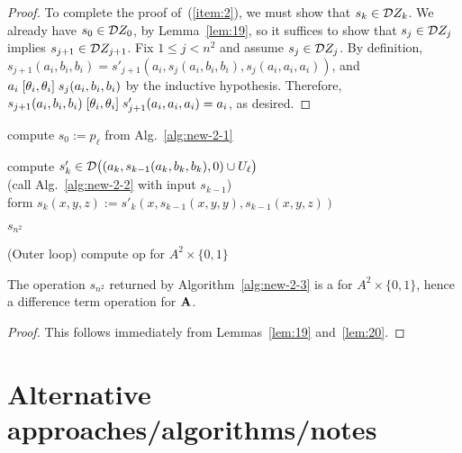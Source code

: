 \begin{proof}
To complete the proof of~(\ref{item:2}), 
we must show that $s_k \in \mathcal{D} Z_k$.   
We already have $s_0\in \mathcal{D} Z_0$, by Lemma~\ref{lem:19},
so it suffices to show that $s_j \in \mathcal{D} Z_j$ implies 
$s_{j+1} \in \mathcal{D} Z_{j+1}$.
Fix $1\leq j < n^2$ and assume $s_j \in \mathcal{D} Z_j$.
By definition, 
$s_{j+1}(a_i, b_i, b_i) =  s'_{j+1}(a_i,s_{j}(a_i,b_i,b_i),s_{j}(a_i,a_i,a_i))$, and
$a_i \mathrel{[\theta_i, \theta_i]} s_j(a_i, b_i, b_i)$ by the inductive hypothesis. Therefore,
$s_{j+1}(a_i, b_i, b_i) \mathrel{[\theta_i, \theta_i]} s'_{j+1}(a_i,a_i,a_i) = a_i$, as desired.
    
  \end{proof}
  

\begin{algorithm}  
  
  compute $s_0 := p_{\ell}$ from Alg.~\ref{alg:new-2-1}
  
   {
    
    compute $s'_k \in \mathcal{D} \bigl((a_k, s_{k-1}(a_k, b_k, b_k), 0) \cup U_{\ell}\bigr)$\\
    (call Alg.~\ref{alg:new-2-2} with input $s_{k-1}$)\\[4pt]

    form $s_k(x,y,z) := s'_k(x, s_{k-1}(x,y,y), s_{k-1}(x,y,z))$
  }
  \Return $s_{n^2}$
  \caption{(Outer loop) compute \ldt  op for $A^2 \times \{0,1\}$\label{alg:new-2-3}}
\end{algorithm}


\begin{prop}
  The operation $s_{n^2}$ returned by Algorithm~\ref{alg:new-2-3} is a \ldto for $A^2 \times \{0,1\}$, hence a difference term operation for $\mathbf{A}$.
\end{prop}
   
\begin{proof}
This follows immediately from Lemmas~\ref{lem:19} and~\ref{lem:20}.
\end{proof}

  
  
  




  \newpage
  \appendix  
    
    \section{Alternative approaches/algorithms/notes}
